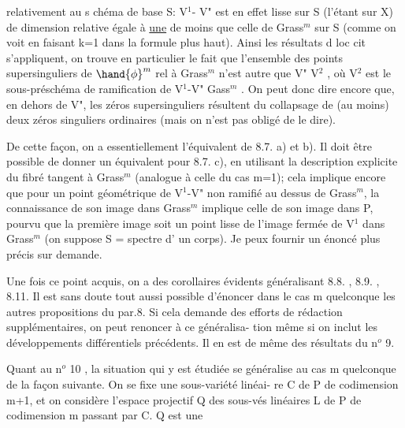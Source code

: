 
relativement  au s chéma de base S:  V$^1$- V"  est en effet lisse sur S
(l'étant sur X)  de dimension relative égale à \uline{une} de moins que celle de
Grass$^m$ sur S  (comme on voit en faisant k=1 dans la formule plus haut).
Ainsi  les résultats d  loc cit  s'appliquent, on trouve en particulier
le fait que l'ensemble des points  supersinguliers  de $\hand{\phi}^m$ rel à Grass$^m$
n'est autre que V" \hand{$\cup$} V$^2$ , où  V$^2$ est le sous-préschéma de ramification
de  V$^1$-V" \hand{$\longrightarrow$} Gass$^m$ .  On peut donc dire encore que, en dehors de V", les
zéros supersinguliers résultent du collapsage de (au moins) deux zéros
singuliers ordinaires (mais on  n'est pas obligé de le dire\hand{)}).

\placedmargin{$|$} De cette façon, on a essentiellement l'équivalent de 8.7. a) et b). Il \placedmargin{$+$}
doit être possible de donner un équivalent pour  8.7. c), en  utilisant
la  description explicite du fibré tangent  à Grass$^m$ (analogue à
celle du cas m=1);  cela implique encore que  pour  un point géométrique de  V$^1$-V"  non
ramifié au dessus  de Grass$^m$, la connaissance de son image dans Grass$^m$
implique celle de son image dans P, pourvu que la première image soit un
point lisse de l'image fermée de V$^1$ dans Grass$^m$  (on suppose S = spectre d'
un corps).  Je peux fournir un énoncé  plus précis sur demande.

Une fois ce point acquis,  on a des corollaires évidents généralisant
8.8. , 8.9. , 8.11.   Il est sans doute tout aussi possible d'énoncer dans
le cas m quelconque  les autres propositions du par.8. Si cela demande des
efforts de rédaction  supplémentaires, on peut renoncer à ce généralisa-%
tion\hand{,}  même si on inclut les développements différentiels précédents.
Il en est de même des résultats du n$^o$ 9.

Quant au n$^o$ 10 ,  la situation qui y est étudiée se généralise au
cas m quelconque de la façon suivante. On se fixe une sous-variété linéai-
re C de P  de codimension m+1, et on considère l'espace projectif Q des
sous-vés linéaires L de P de codimension m passant par C. Q est une

